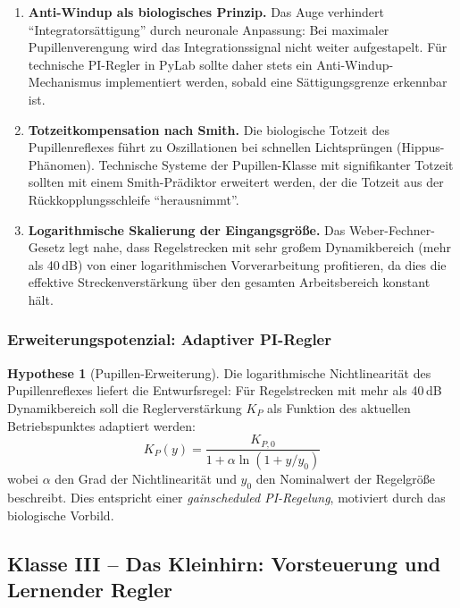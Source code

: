 \documentclass[a4paper,12pt]{article}
\theoremstyle{definition}
\newtheorem{hypothese}{Hypothese}
\begin{document}
\begin{enumerate}
	\item \textbf{Anti-Windup als biologisches Prinzip.}
	Das Auge verhindert ``Integratorsättigung'' durch neuronale Anpassung:
	Bei maximaler Pupillenverengung wird das Integrationssignal nicht
	weiter aufgestapelt. Für technische PI-Regler in PyLab sollte
	daher stets ein Anti-Windup-Mechanismus implementiert werden,
	sobald eine Sättigungsgrenze erkennbar ist.
	
	\item \textbf{Totzeitkompensation nach Smith.}
	Die biologische Totzeit des Pupillenreflexes führt zu
	Oszillationen bei schnellen Lichtsprüngen (Hippus-Phänomen).
	Technische Systeme der Pupillen-Klasse mit signifikanter Totzeit
	sollten mit einem Smith-Prädiktor erweitert werden, der die Totzeit
	aus der Rückkopplungsschleife ``herausnimmt''.
	
	\item \textbf{Logarithmische Skalierung der Eingangsgröße.}
	Das Weber-Fechner-Gesetz legt nahe, dass Regelstrecken mit sehr
	großem Dynamikbereich (mehr als 40\,dB) von einer logarithmischen
	Vorverarbeitung profitieren, da dies die effektive Streckenverstärkung
	über den gesamten Arbeitsbereich konstant hält.
\end{enumerate}

\subsubsection{Erweiterungspotenzial: Adaptiver PI-Regler}

\begin{hypothese}[Pupillen-Erweiterung]
	Die logarithmische Nichtlinearität des Pupillenreflexes liefert die
	Entwurfsregel: Für Regelstrecken mit mehr als 40\,dB Dynamikbereich soll
	die Reglerverstärkung $K_P$ als Funktion des aktuellen Betriebspunktes
	adaptiert werden:
	\[
	K_P(y) = \frac{K_{P,0}}{1 + \alpha \ln(1 + y/y_0)}
	\]
	wobei $\alpha$ den Grad der Nichtlinearität und $y_0$ den Nominalwert
	der Regelgröße beschreibt. Dies entspricht einer \emph{gainscheduled
		PI-Regelung}, motiviert durch das biologische Vorbild.
\end{hypothese}

\subsection{Klasse III -- Das Kleinhirn: Vorsteuerung und Lernender Regler}
\label{subsec:klasse_kleinhirn}
\end{document}
